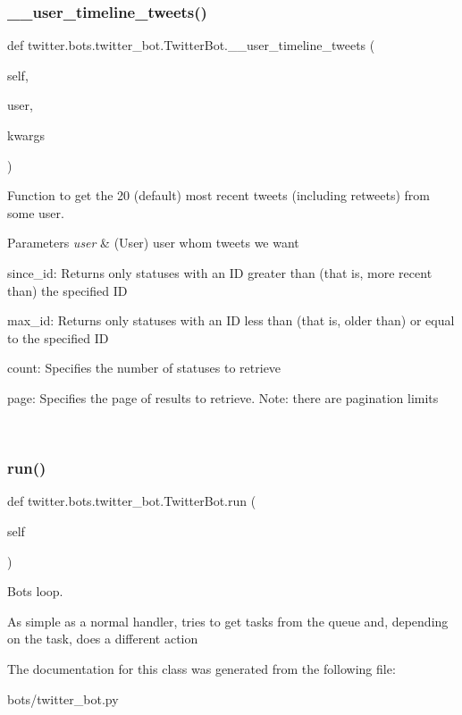 \subsubsection{\texorpdfstring{\+\_\+\+\_\+user\+\_\+timeline\+\_\+tweets()}{\_\_user\_timeline\_tweets()}}
{\footnotesize\ttfamily def twitter.\+bots.\+twitter\+\_\+bot.\+Twitter\+Bot.\+\_\+\+\_\+user\+\_\+timeline\+\_\+tweets (\begin{DoxyParamCaption}\item[{}]{self,  }\item[{}]{user,  }\item[{}]{kwargs }\end{DoxyParamCaption})\hspace{0.3cm}{\ttfamily [private]}}



Function to get the 20 (default) most recent tweets (including retweets) from some user. 


\begin{DoxyParams}{Parameters}
{\em user} & (User) user whom tweets we want
\begin{DoxyItemize}
\item since\+\_\+id\+: Returns only statuses with an ID greater than (that is, more recent than) the specified ID
\item max\+\_\+id\+: Returns only statuses with an ID less than (that is, older than) or equal to the specified ID
\item count\+: Specifies the number of statuses to retrieve
\item page\+: Specifies the page of results to retrieve. Note\+: there are pagination limits 
\end{DoxyItemize}\\
\hline
\end{DoxyParams}
\mbox{\label{classtwitter_1_1bots_1_1twitter__bot_1_1TwitterBot_aa0425e1810fa53dab90ca0e9d7b973d1}} 
\subsubsection{\texorpdfstring{run()}{run()}}
{\footnotesize\ttfamily def twitter.\+bots.\+twitter\+\_\+bot.\+Twitter\+Bot.\+run (\begin{DoxyParamCaption}\item[{}]{self }\end{DoxyParamCaption})}



Bot\textquotesingle{}s loop. 

As simple as a normal handler, tries to get tasks from the queue and, depending on the task, does a different action 

The documentation for this class was generated from the following file\+:\begin{DoxyCompactItemize}
\item 
bots/twitter\+\_\+bot.\+py\end{DoxyCompactItemize}
